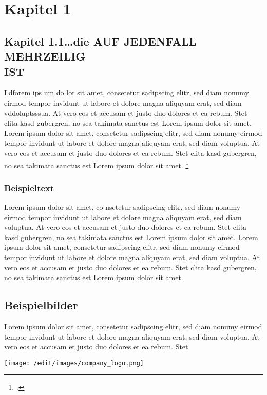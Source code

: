 \section{Kapitel 1}

\subsection{Kapitel 1.1\ldots die AUF JEDENFALL MEHRZEILIG\\IST}

Ldforem ips um do lor sit amet, consetetur sadipscing elitr, \label{Referenz}
sed diam  nonumy eirmod tempor invidunt ut labore et dolore magna aliquyam erat,
sed diam vddoluptsssua. At vero eos et accusam et justo duo dolores et ea rebum.
Stet clita kasd gubergren, no sea takimata sanctus est Lorem ipsum dolor sit amet. Lorem ipsum dolor sit amet, consetetur sadipscing elitr, sed diam nonumy eirmod tempor invidunt ut labore et dolore magna aliquyam erat, sed diam voluptua. At vero eos et accusam et justo duo dolores et ea rebum. Stet clita kasd gubergren, no sea takimata sanctus est Lorem ipsum dolor sit amet.
\footcite[Vgl.][Experto.de, Artikel über das und jenes]{praxishandbuch:bpmn2}
\subsubsection{Beispieltext}
Lorem ipsum dolor sit amet, co nsetetur sadipscing elitr, sed diam
nonumy eirmod tempor invidunt ut labore et dolore magna aliquyam erat, sed diam voluptua. At vero eos et accusam et justo duo dolores et ea rebum. Stet clita kasd gubergren, no sea takimata sanctus est Lorem ipsum dolor sit amet. Lorem ipsum dolor sit amet, consetetur sadipscing elitr, sed diam nonumy eirmod tempor invidunt ut labore et dolore magna aliquyam erat, sed diam voluptua. At vero eos et accusam et justo duo dolores et ea rebum. Stet clita kasd gubergren, no sea takimata sanctus est Lorem ipsum dolor sit amet.

\clearpage

\subsection{Beispielbilder}
Lorem ipsum dolor sit amet, consetetur sadipscing elitr, sed diam nonumy eirmod tempor invidunt ut labore et dolore magna aliquyam erat, sed diam voluptua. At vero eos et accusam et justo duo dolores et ea rebum. Stet

\begin{center}
	\texttt{[image: /edit/images/company\_logo.png]}
\end{center}

